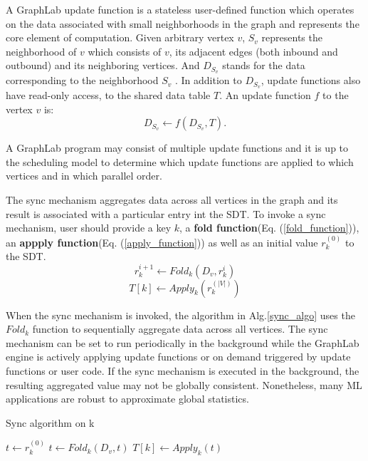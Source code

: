 \documentclass {article}
\begin{document}
A GraphLab update function is a stateless user-defined
function which operates on the data associated with small
neighborhoods in the graph and represents the core element
of computation. Given arbitrary vertex $v$, $S_v$ represents the
neighborhood of $v$ which consists of $v$, its adjacent edges
(both inbound and outbound) and its neighboring vertices. And $D_{S_v}$ stands for the data corresponding to the neighborhood $S_v$
. In addition to $D_{S_v}$, update functions also have read-only access, to the shared
data table $T$. An update function $f$ to the vertex $v$ is:
\begin{equation}
  D_{S_v} \leftarrow f(D_{S_v}, T).
\end{equation}

A GraphLab program may consist of
multiple update functions and it is up to the scheduling
model to determine which update functions
are applied to which vertices and in which parallel order.


The sync mechanism aggregates data across all vertices in
the graph and its result is associated with a particular entry int the SDT. To invoke a sync mechanism, user
should provide a key $k$, a \textbf{fold function}(Eq. (\ref{fold_function})), an \textbf{appply function}(Eq. (\ref{apply_function})) as well as an initial value $r^{(0)}_k$ to the SDT.
\begin{equation}\label{fold_function}
r^{i+1}_k \leftarrow Fold_k (D_v, r^{i}_k)
\end{equation}
\begin{equation}\label{apply_function}
  T[k] \leftarrow Apply_k(r_k^{(|V|)})
\end{equation}

When the sync mechanism is invoked, the algorithm in
Alg.\ref{sync_algo} uses the $Fold_k $
function to sequentially aggregate
data across all vertices. The sync mechanism can be set to run periodically in the
background while the GraphLab engine is actively applying update functions or on demand triggered by update
functions or user code. If the sync mechanism is executed
in the background, the resulting aggregated value may not
be globally consistent. Nonetheless, many ML applications
are robust to approximate global statistics.


\begin{algorithm}
\caption{Sync algorithm on k}
\label{sync_algo}
\begin{algorithmic}[1]
    \State $t \leftarrow r_k^{(0)}$
        \State $t \leftarrow Fold_k(D_v, t)$
    \EndFor
    \State $T[k] \leftarrow Apply_k(t)$

\EndProcedure


\end{algorithmic}
\end{algorithm}
\end{document}

